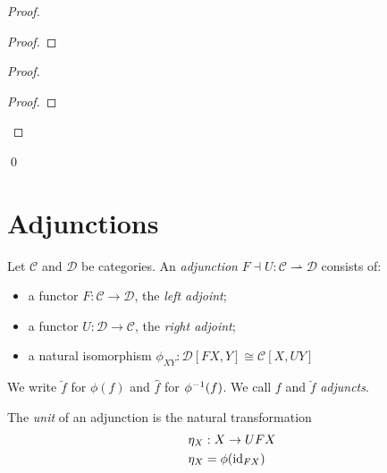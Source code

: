 \begin{proof}
\pf
{}
\begin{proof}
\end{proof}
\begin{proof}
	\begin{proof}
	\end{proof}
\end{proof}
\qed
\end{proof}

\chapter{Adjunctions}

\begin{df}[Adjunction]
Let $\mathcal{C}$ and $\mathcal{D}$ be categories. An \emph{adjunction} $F \dashv U : \mathcal{C} \rightharpoonup \mathcal{D}$ consists of:
\begin{itemize}
\item a functor $F : \mathcal{C} \rightarrow \mathcal{D}$, the \emph{left adjoint};
\item a functor $U : \mathcal{D} \rightarrow \mathcal{C}$, the \emph{right adjoint};
\item a natural isomorphism $\phi_{XY} : \mathcal{D}[FX,Y] \cong \mathcal{C}[X,UY]$
\end{itemize}
We write $\breve{f}$ for $\phi(f)$ and $\hat{f}$ for ${\phi}^{-1}(f)$. We call $f$ and $\breve{f}$ \emph{adjuncts}.
\end{df}

\begin{df}[Unit]
The \emph{unit} of an adjunction is the natural transformation
\begin{align*}
\eta_X & : X \rightarrow UFX \\
\eta_X & = \phi(\mathrm{id}_{FX})
\end{align*}
\end{df}

